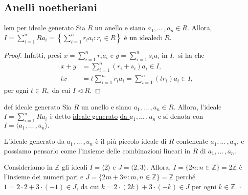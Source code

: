 
\subsection{Anelli noetheriani}

\begin{lem}[]{lem per ideale generato}
  \vspace{-3mm}
  Sia $R$ un anello e siano $a_1,...\,,a_n\in R.$ Allora, 
  $I=\sum\limits_{i=1}^n Ra_i=\left\{ \sum\limits_{i=1}^n r_ia_i:r_i\in R \right\}$ è un ideale\footnotemark di $R.$ 
\end{lem}
\begin{proof}
  Infatti, presi $x=\sum\limits_{i=1}^n r_ia_i$ e $y=\sum\limits_{i=1}^n s_ia_i$ in $I,$ si ha che 
  \vspace{-4mm}
  \begin{align*}
    x+y &=\sum\limits_{i=1}^n (r_i+s_i)a_i\in I,\\
    tx &=t\sum\limits_{i=1}^n r_ia_i=\sum\limits_{i=1}^n (tr_i)a_i\in I,
  \end{align*}
  per ogni $t\in R,$ da cui $I\lhd R.$
\end{proof}



\vspace{-1mm}

\begin{defn}{def ideale generato}
  Sia $R$ un anello e siano $a_1,...\,,a_n\in R.$ Allora, l'ideale $I=\sum\limits_{i=1}^n Ra_i$ è detto \underline{ideale generato} 
  \underline{da $a_1,...\,,a_n$} e si denota con $I=\langle a_1,...\,,a_n\rangle.$
\end{defn}

\noindent L'ideale generato da $a_1,...\,,a_n$ è il più piccolo ideale di $R$ contenente $a_1,...\,,a_n$, 
e possiamo pensarlo come l'insieme delle combinazioni lineari in $R$ di $a_1,...\,,a_n$.

\begin{exm}
  Consideriamo in $\mathbb{Z}$ gli ideali $I=\langle 2\rangle$ e $J=\langle 2,3\rangle$. Allora, $I=\{2n: n\in\mathbb{Z}\}=2\mathbb{Z}$ 
  è l'insieme dei numeri pari e $J=\{2m+3n : m,n\in \mathbb{Z}\}=\mathbb{Z}$ perché $1=2\cdot 2+3\cdot (-1)\in J$, 
  da cui $k=2\cdot (2k)+3\cdot (-k)\in J$ per ogni $k\in \mathbb{Z}. \ \square$
\end{exm}

